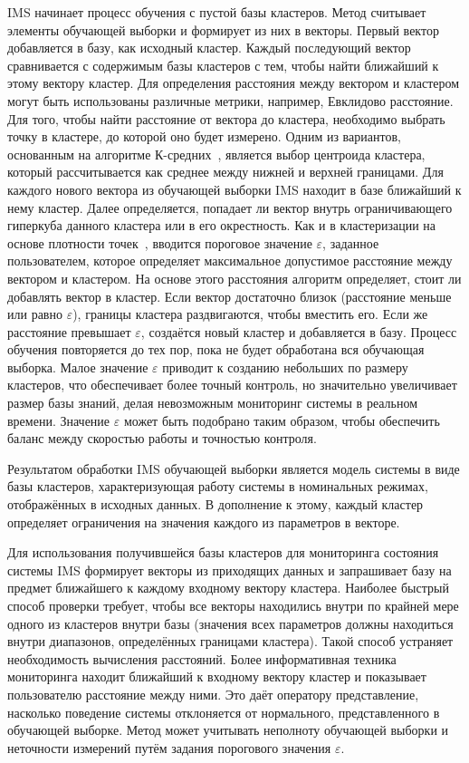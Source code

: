 IMS начинает процесс обучения с пустой базы кластеров. Метод считывает элементы обучающей выборки и формирует из них в векторы. Первый вектор добавляется в базу, как исходный кластер. Каждый последующий вектор сравнивается с содержимым базы кластеров с тем, чтобы найти ближайший к этому вектору кластер. Для определения расстояния между вектором и кластером могут быть использованы различные метрики, например, Евклидово расстояние. Для того, чтобы найти расстояние от вектора до кластера, необходимо выбрать точку в кластере, до которой оно будет измерено. Одним из вариантов, основанным на алгоритме К-средних~\cite{BradleyKMeans}, является выбор центроида кластера, который рассчитывается как среднее между нижней и верхней границами. Для каждого нового вектора из обучающей выборки IMS находит в базе ближайший к нему кластер. Далее определяется, попадает ли вектор внутрь ограничивающего гиперкуба данного кластера или в его окрестность. Как и в кластеризации на основе плотности точек~\cite{EsterDensityBasedClustering}, вводится пороговое значение $\varepsilon$, заданное пользователем, которое определяет максимальное допустимое расстояние между вектором и кластером. На основе этого расстояния алгоритм определяет, стоит ли добавлять вектор в кластер. Если вектор достаточно близок (расстояние меньше или равно $\varepsilon$), границы кластера раздвигаются, чтобы вместить его. Если же расстояние превышает $\varepsilon$, создаётся новый кластер и добавляется в базу. Процесс обучения повторяется до тех пор, пока не будет обработана вся обучающая выборка. Малое значение $\varepsilon$ приводит к созданию небольших по размеру кластеров, что обеспечивает более точный контроль, но значительно увеличивает размер базы знаний, делая невозможным мониторинг системы в реальном времени. Значение $\varepsilon$ может быть подобрано таким образом, чтобы обеспечить баланс между скоростью работы и точностью контроля.

Результатом обработки IMS обучающей выборки является модель системы в виде базы кластеров, характеризующая работу системы в номинальных режимах, отображённых в исходных данных. В дополнение к этому, каждый кластер определяет ограничения на значения каждого из параметров в векторе.

Для использования получившейся базы кластеров для мониторинга состояния системы IMS формирует векторы из приходящих данных и запрашивает базу на предмет ближайшего к каждому входному вектору кластера. Наиболее быстрый способ проверки требует, чтобы все векторы находились внутри по крайней мере одного из кластеров внутри базы (значения всех параметров должны находиться внутри диапазонов, определённых границами кластера). Такой способ устраняет необходимость вычисления расстояний. Более информативная техника мониторинга находит ближайший к входному вектору кластер и показывает пользователю расстояние между ними. Это даёт оператору представление, насколько поведение системы отклоняется от нормального, представленного в обучающей выборке. Метод может учитывать неполноту обучающей выборки и неточности измерений путём задания порогового значения $\varepsilon$.

